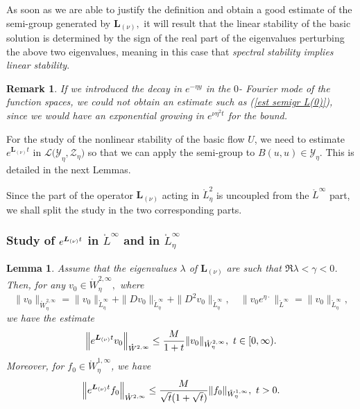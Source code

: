 \documentclass[11pt]{article}
\newtheorem{lemma}[theorem]{Lemma}
\newtheorem{remark}[theorem]{Remark}
\begin{document}
As soon
as we are able to justify the definition and obtain a good estimate of the
semi-group generated by $\boldsymbol{L}_{(\nu )},$ it will result that the
linear stability of the basic solution is determined by the sign of the real part of the
eigenvalues perturbing the above two eigenvalues, meaning in this case that 
\emph{spectral stability implies linear stability}.

\begin{remark}
If we introduced the decay in $e^{-\eta y}$ in the $0$- Fourier mode of the
function spaces, we could not obtain an estimate such as (\ref{est semigr
L(0)}), since we would have an exponential growing in $e^{\nu \eta^{2}t}$ for the bound. 
\end{remark}

For the study of the nonlinear stability of the basic flow $U$, we need to
estimate $e^{\boldsymbol{L}_{(\nu )}t}$ in $\mathcal{L(Y}_{\eta},\mathcal{Z}%
_{\eta})$ so that we can apply the semi-group to $B(u,u)\in \mathcal{Y}_{\eta}.$ This
is detailed  in the next Lemmas.

Since the part of the operator $\boldsymbol{L}_{(\nu )}$ acting in $%
\mathring{L}_{\eta}^{2}$ is uncoupled from the $\mathring{L}^{\infty }$ part,
we shall split the study in the two corresponding parts.




\subsubsection{Study of $e^{\boldsymbol{L}_{(\protect\nu )}t}$ in $\mathring{L}%
^{\infty }$ and in $\mathring{L}_{\eta}^{\infty }$}



\begin{lemma} \label{lem:estimsemigroup poids}
Assume that the eigenvalues $\lambda$ of $\boldsymbol{L}_{(\nu )}$ are such that $%
\Re \lambda <\gamma <0$.  Then, for any $v_{0}\in \mathring{W}_{\eta}^{2,\infty },$
 where%
\begin{equation*}
\|v_{0}\|_{\mathring{W}_{\eta}^{2,\infty }}=\|v_{0}\|_{\mathring{L}_{\eta}^{\infty }}
+\|Dv_{0}\|_{\mathring{L}_{\eta}^{\infty }}+\|D^2 v_{0}\|_{\mathring{L}_{\eta}^{\infty }}, \quad 
\|v_{0}e^{\eta\cdot }\|_{\mathring{L}^{\infty }}=\|v_{0}\|_{\mathring{L}_{\eta}^{\infty }},
\end{equation*}%
we have the estimate%
\begin{equation}
\Bigl\|e^{\boldsymbol{L}_{(\nu )}t}v_{0}\Bigr\|_{\mathring{W}^{2,\infty }}\leq \frac{M%
}{1+t}\|v_{0}\|_{\mathring{W}_{\eta}^{2,\infty }},\text{ }%
t\in \lbrack 0,\infty ).  \label{estim sg L(0) W2}
\end{equation}%
Moreover, for $f_{0}\in \mathring{W}_{\eta}^{1,\infty }$, we have%
\begin{equation}
\Bigl\|e^{\boldsymbol{L}_{(\nu )}t}f_{0}\Bigr\|_{\mathring{W}^{2,\infty }}\leq \frac{M%
}{\sqrt{t} ( 1 + \sqrt{t})}\|f_{0}\|_{\mathring{W}_{\eta}^{1,\infty }},\text{ 
}t>0.  \label{estim sg L(0) W1}
\end{equation}
\end{lemma}
\end{document}
